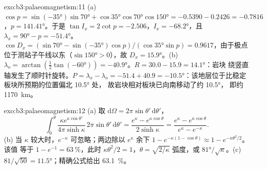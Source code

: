 \begin{solution}{exo:b3:palaeomagnetism:11}
(a) $\cos p = \sin(\ang{-35})\sin\ang{70} + \cos\ang{35}\cos\ang{70}\cos\ang{150}
= -0.5390 - 0.2426 = -0.7816$，$p = \ang{141.41}$。于是 $\tan I_x = 2\cot p =
-2.506$，$I_x = \ang{-68.2}$，且 $\lambda_x = \ang{90} - p = \ang{-51.4}$。
$\cos D_x = (\sin\ang{70} - \sin(\ang{-35})\cos p)/(\cos\ang{35}\sin p) =
0.9617$，由于极点位于测站子午线以东（$\sin\ang{150} >
0$），故 $D_x = \ang{15.9}$。(b) $\lambda_o = \arctan(\tfrac12\tan(\ang{-60})) =
\ang{-40.9}$。$R = 30.0 - 15.9 = \ang{14.1}$：岩块
绕竖直轴发生了顺时针旋转。$P = \lambda_x - \lambda_o = -51.4 + 40.9 =
\ang{-10.5}$：该地层位于比稳定板块所预期的位置偏北 \ang{10.5} 处，
故岩块相对板块已向南移动了约 \ang{10.5}，
即约 \qty{1170}{km}。
\end{solution}

\begin{solution}{exo:b3:palaeomagnetism:12}
(a) 取 $\mathrm d\Omega = 2\pi\sin\theta'\,\mathrm d\theta'$，
\[
  \int_0^\theta\frac{\kappa e^{\kappa\cos\theta'}}{4\pi\sinh\kappa}\,2\pi\sin\theta'\,
  \mathrm d\theta' = \frac{e^\kappa - e^{\kappa\cos\theta}}{2\sinh\kappa}
  = \frac{e^\kappa - e^{\kappa\cos\theta}}{e^\kappa - e^{-\kappa}} .
\]
(b) 当 $\kappa$ 较大时，$e^{-\kappa}$ 可忽略；两边除以 $e^\kappa$
余下 $1 - e^{-\kappa(1 - \cos\theta)} \approx 1 - e^{-\kappa\theta^2/2}$。该值
等于 $1 - e^{-1} = \qty{63}{\percent}$，此时 $\kappa\theta^2/2 = 1$，$\theta =
\sqrt{2/\kappa}$ 弧度，或 $\ang{81}/\sqrt\kappa$。(c) $81/\sqrt{50} =
\ang{11.5}$；精确公式给出 \qty{63.1}{\percent}。
\end{solution}


